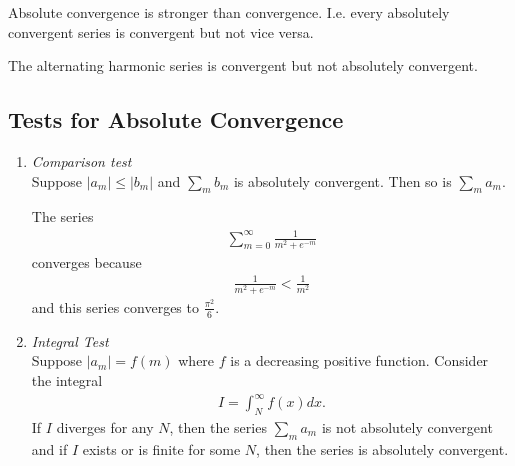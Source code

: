 \begin{rk}
	Absolute convergence is stronger than convergence. I.e. every absolutely convergent series is convergent but not vice versa.
\end{rk}

\begin{ex}
	The alternating harmonic series is convergent but not absolutely convergent.
\end{ex}

\subsection{Tests for Absolute Convergence}
\begin{enumerate}
	\item
	\emph{Comparison test} \\
	Suppose $\displaystyle |a_m| \le |b_m|$ and $\displaystyle \sum_m b_m$ is absolutely convergent. Then so is $ \displaystyle \sum_m a_m$.
	
	\begin{ex} The series
		\begin{align*}
		\sum_{m=0}^\infty \frac 1 {m^2+e^{-m}}  
		\end{align*}
		converges because
		\begin{align*}
		\frac 1 {m^2+ e^{-m}} < \frac 1 {m^2} 
		\end{align*}
		and this series converges to $\frac{\pi^2} 6$.
	\end{ex}
	\item
	\emph{Integral Test}\\
	Suppose $|a_m| = f(m)$ where $f$ is a decreasing positive function. Consider the integral
	\begin{align*}
	I = \int_N^\infty f(x) dx.
	\end{align*}
	If $I$ diverges for any $N$, then the series $\sum_m a_m$ is not absolutely convergent and if $I$ exists or is finite for some $N$, then the series is absolutely convergent.
	

\end{enumerate}
